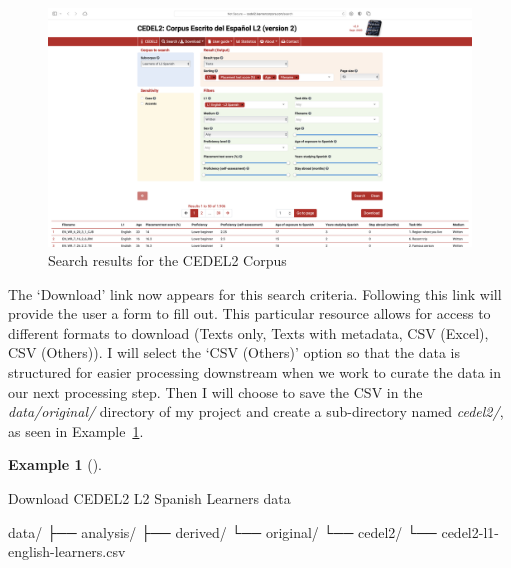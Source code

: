 \documentclass[
  letterpaper,
  DIV=11,
  numbers=noendperiod]{scrreport}
\newenvironment{Shaded}{\begin{snugshade}}{\end{snugshade}}
\newcommand{\ExtensionTok}[1]{\textcolor[rgb]{0.00,0.00,0.00}{#1}}
\newcommand{\NormalTok}[1]{\textcolor[rgb]{0.00,0.00,0.00}{#1}}
\theoremstyle{definition}
\newtheorem{example}{Example}[chapter]
\theoremstyle{remark}
\begin{document}
\begin{figure}[H]

{\centering \includegraphics[width=1\textwidth,height=\textheight]{figures/ad-cedel2-results.png}

}

\caption{\label{fig-ad-cedel2-results}Search results for the CEDEL2
Corpus}

\end{figure}

The `Download' link now appears for this search criteria. Following this
link will provide the user a form to fill out. This particular resource
allows for access to different formats to download (Texts only, Texts
with metadata, CSV (Excel), CSV (Others)). I will select the `CSV
(Others)' option so that the data is structured for easier processing
downstream when we work to curate the data in our next processing step.
Then I will choose to save the CSV in the \emph{data/original/}
directory of my project and create a sub-directory named \emph{cedel2/},
as seen in Example~\ref{exm-ad-cedel2-learners-download}.

\begin{example}[]\protect\hypertarget{exm-ad-cedel2-learners-download}{}\label{exm-ad-cedel2-learners-download}

Download CEDEL2 L2 Spanish Learners data

\begin{Shaded}
\begin{Highlighting}[]
\ExtensionTok{data/}
\ExtensionTok{├──}\NormalTok{ analysis/}
\ExtensionTok{├──}\NormalTok{ derived/}
\ExtensionTok{└──}\NormalTok{ original/}
    \ExtensionTok{└──}\NormalTok{ cedel2/}
       \ExtensionTok{└──}\NormalTok{ cedel2{-}l1{-}english{-}learners.csv}
\end{Highlighting}
\end{Shaded}

\end{example}
\end{document}
